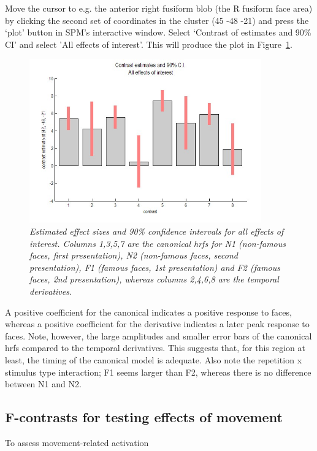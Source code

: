 Move the cursor to e.g. the anterior right fusiform blob (the R fusiform face area) by clicking the second set of coordinates in the cluster (45 -48 -21) and press the `plot' button in SPM's interactive window. Select `Contrast of estimates and 90\% CI' and select 'All effects of interest'. This will produce the plot in Figure~\ref{con_all_plot}.
\begin{figure}
\begin{center}
\includegraphics[width=100mm]{faces/con_all_plot}
\caption{\em Estimated effect sizes and 90\% confidence intervals for all effects of interest. Columns 1,3,5,7 are the canonical hrfs for N1 (non-famous faces, first presentation), N2 (non-famous faces, second presentation), F1 (famous faces, 1st presentation) and F2 (famous faces, 2nd presentation), whereas columns 2,4,6,8 are the temporal derivatives. \label{con_all_plot} }
\end{center}
\end{figure}

A positive coefficient for the canonical indicates a positive response to faces, whereas a positive coefficient for the derivative indicates a later peak response to faces.  Note, however, the large amplitudes and smaller error bars of the canonical hrfs compared to the temporal derivatives. This suggests that, for this region at least, the timing of the canonical model is adequate. Also note the repetition x stimulus type interaction; F1 seems larger than F2, whereas there is no difference between N1 and N2. 

\subsection{F-contrasts for testing effects of movement}

To assess movement-related activation

